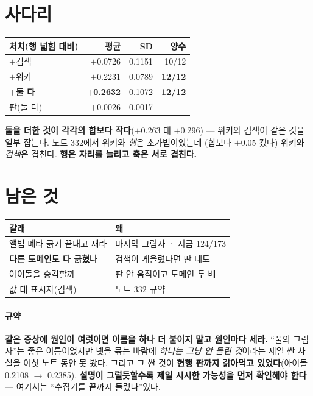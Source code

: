 \documentclass[10pt]{article}
\begin{document}
\section{사다리}

\begin{center}\footnotesize
\begin{tabular}{lrrr}
\hline
처치(행 넓힘 대비) & 평균 & SD & 양수 \\
\hline
$+$검색 & $+$0.0726 & 0.1151 & 10/12 \\
$+$위키 & $+$0.2231 & 0.0789 & \textbf{12/12} \\
\textbf{$+$둘 다} & \textbf{$+$0.2632} & 0.1072 & \textbf{12/12} \\
\hline
판(둘 다) & $+$0.0026 & 0.0017 & \\
\hline
\end{tabular}
\end{center}

\textbf{둘을 더한 것이 각각의 합보다 작다}($+$0.263 대 $+$0.296) --- 위키와
검색이 같은 것을 일부 잡는다. 노트 332에서 위키와 \emph{행}은 초가법이었는데
(합보다 $+$0.05 컸다) 위키와 \emph{검색}은 겹친다. \textbf{행은 자리를
늘리고 축은 서로 겹친다.}

\section{남은 것}
\begin{center}\footnotesize
\begin{tabular}{ll}
\hline
갈래 & 왜 \\
\hline
앨범 메타 긁기 끝내고 재라 & 마지막 그림자 · 지금 124/173 \\
\textbf{다른 도메인도 다 긁혔나} & 검색이 게을렀다면 딴 데도 \\
아이돌을 승격할까 & 판 안 움직이고 도메인 두 배 \\
값 대 표시자(검색) & 노트 332 규약 \\
\hline
\end{tabular}
\end{center}

\paragraph{규약} \textbf{같은 증상에 원인이 여럿이면 이름을 하나 더 붙이지
말고 원인마다 세라.} ``풀의 그림자''는 좋은 이름이었지만 넷을 묶는 바람에
\emph{하나는 그냥 안 돌린 것}이라는 제일 싼 사실을 여섯 노트 동안 못 봤다.
그리고 그 싼 것이 \textbf{현행 판까지 갉아먹고 있었다}(아이돌 0.2108 $\to$
0.2385). \textbf{설명이 그럴듯할수록 제일 시시한 가능성을 먼저 확인해야
한다} --- 여기서는 ``수집기를 끝까지 돌렸나''였다.
\end{document}
